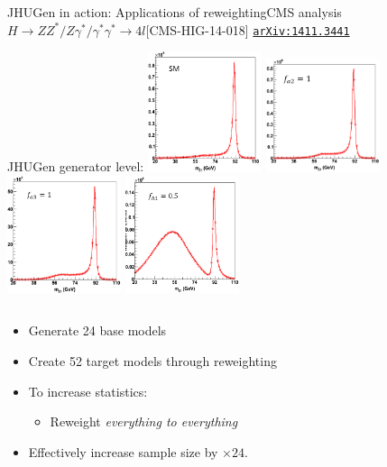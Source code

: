 \documentclass[usenames,dvipsnames,svgnames,table]{beamer}
\newcommand{\arxiv}[1]{\href{http://arxiv.org/abs/#1}{\nolinkurl{arXiv:#1}}}
\begin{document}
\begin{frame}{JHUGen in action: Applications of reweighting}{CMS analysis $H \to ZZ^*/Z\gamma^*/\gamma^*\gamma^* \to 4l$\hfill [CMS-HIG-14-018] \arxiv{1411.3441}}

JHUGen generator level:
\includegraphics[width=0.25\textwidth]{HVV/SM}
\includegraphics[width=0.25\textwidth]{HVV/fa2}
\includegraphics[width=0.25\textwidth]{HVV/fa3}
\includegraphics[width=0.25\textwidth]{HVV/flambda1}
\begin{columns}
\begin{column}{0.6\textwidth}
\footnotesize
\begin{itemize}
\item Generate 24 base models
\item Create 52 target models through reweighting
\item To increase statistics:
\begin{itemize}
\item Reweight \emph{everything to everything}
\end{itemize}
\item Effectively increase sample size by $\times 24$.

\end{itemize}
\end{column}
\end{columns}
\end{frame}
\end{document}
